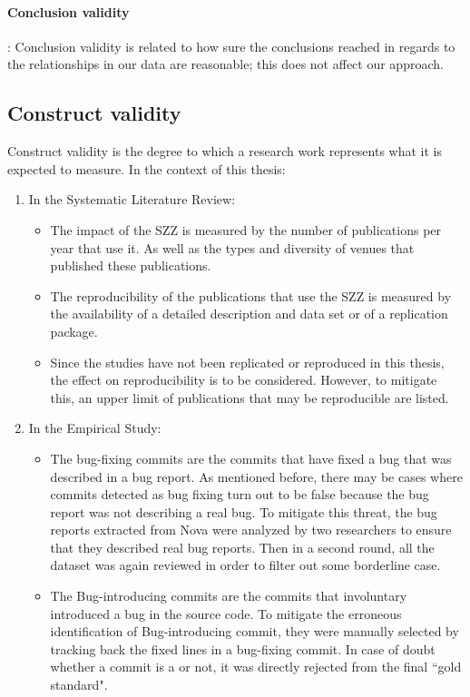 \documentclass[a4paper, 12pt]{book}
\begin{document}
 \paragraph{Conclusion validity}: Conclusion validity is related to how sure the conclusions reached in regards to the relationships in our data are reasonable; this does not affect our approach. 
 
\subsection{Construct validity}
Construct validity is the degree to which a research work represents what it is expected to measure. In the context of this thesis: 

\begin{enumerate}
	\item In the Systematic Literature Review: 
		\begin{itemize}
			\item The impact of the SZZ is measured by the number of publications per year that use it. As well as the types and diversity of venues that published these publications.
			\item The reproducibility of the publications that use the SZZ is measured by the availability of a detailed description and data set or of a replication package.  
			\item Since the studies have not been replicated or reproduced in this thesis, the effect on reproducibility is to be considered. However, to mitigate this, an upper limit of publications that may be reproducible are listed.  
		\end{itemize}
	 \item In the Empirical Study: 
	 	\begin{itemize}
			\item The bug-fixing commits are the commits that have fixed a bug that was described in a bug report. As mentioned before, there may be cases where commits detected as bug fixing turn out to be false because the bug report was not describing a real bug. To mitigate this threat, the bug reports extracted from Nova were analyzed by two researchers to ensure that they described real bug reports. Then in a second round, all the dataset was again reviewed in order to filter out some borderline case. 
			\item The Bug-introducing commits are the commits that involuntary introduced a bug in the source code. To mitigate the erroneous identification of Bug-introducing commit, they were manually selected by tracking back the fixed lines in a bug-fixing commit. In case of doubt whether a commit is a \BIC or not, it was directly rejected from the final ``gold standard". 

\end{itemize}
\end{enumerate}
\end{document}
